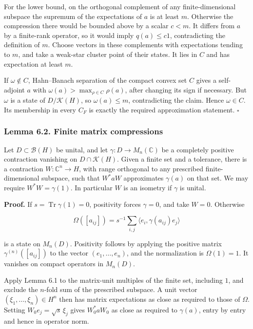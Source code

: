 \documentclass[
  11pt,
]{article}
\begin{document}
For the lower bound, on the orthogonal complement of any
finite-dimensional subspace the supremum of the expectations of \(a\) is
at least \(m\). Otherwise the compression there would be bounded above
by a scalar \(c<m\). It differs from \(a\) by a finite-rank operator, so
it would imply \(q(a)\leq c1\), contradicting the definition of \(m\).
Choose vectors in these complements with expectations tending to \(m\),
and take a weak-star cluster point of their states. It lies in \(C\) and
has expectation at least \(m\).

If \(\omega\notin C\), Hahn--Banach separation of the compact convex set
\(C\) gives a self-adjoint \(a\) with
\(\omega(a)>\max_{\rho\in C}\rho(a)\), after changing its sign if
necessary. But \(\omega\) is a state of \(D/\mathcal K(H)\), so
\(\omega(a)\leq m\), contradicting the claim. Hence \(\omega\in C\). Its
membership in every \(C_F\) is exactly the required approximation
statement. \(\square\)

\subsubsection{Lemma 6.2. Finite matrix
compressions}\label{lemma-6.2.-finite-matrix-compressions}

Let \(D\subset\mathcal B(H)\) be unital, and let
\(\gamma:D\to M_n(\mathbb C)\) be a completely positive contraction
vanishing on \(D\cap\mathcal K(H)\). Given a finite set and a tolerance,
there is a contraction \(W:\mathbb C^n\to H\), with range orthogonal to
any prescribed finite-dimensional subspace, such that \(W^*aW\)
approximates \(\gamma(a)\) on that set. We may require
\(W^*W=\gamma(1)\). In particular \(W\) is an isometry if \(\gamma\) is
unital.

\textbf{Proof.} If \(s=\operatorname{Tr}\gamma(1)=0\), positivity forces
\(\gamma=0\), and take \(W=0\). Otherwise

\[
\Omega([a_{ij}])=s^{-1}\sum_{i,j}
\langle e_i,\gamma(a_{ij})e_j\rangle
\]

is a state on \(M_n(D)\). Positivity follows by applying the positive
matrix \(\gamma^{(n)}([a_{ij}])\) to the vector \((e_1,\ldots,e_n)\),
and the normalization is \(\Omega(1)=1\). It vanishes on compact
operators in \(M_n(D)\).

Apply Lemma 6.1 to the matrix-unit multiples of the finite set,
including \(1\), and exclude the \(n\)-fold sum of the prescribed
subspace. A unit vector \((\xi_1,\ldots,\xi_n)\in H^n\) then has matrix
expectations as close as required to those of \(\Omega\). Setting
\(W_0 e_j=\sqrt s\,\xi_j\) gives \(W_0^*aW_0\) as close as required to
\(\gamma(a)\), entry by entry and hence in operator norm.
\end{document}
